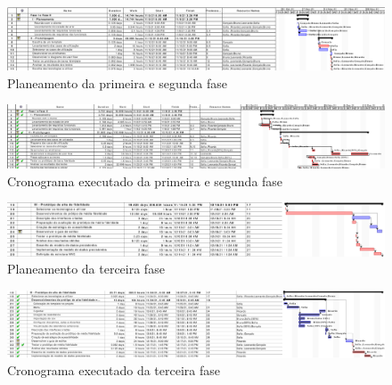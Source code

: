 \documentclass[11pt, twoside]{report}
\begin{document}
	\clearpage
	\begin{landscape}
		\pagestyle{empty}
		
		\begin{figure}[H] 
			\centering 			\includegraphics[width=1.4\textwidth,height=1.4\textheight,keepaspectratio]{image/planeamento_1fase}
			\caption{Planeamento da primeira e segunda fase}
			
		\end{figure}
	
	\begin{figure}[H] 
		\centering 			\includegraphics[width=1.4\textwidth,height=1.4\textheight,keepaspectratio]{image/cronogramaexecutado}
		\caption{Cronograma executado da primeira e segunda fase}
		\label{cronogramaexecutado}
	\end{figure}

	\begin{figure}[H] 
		\centering 			\includegraphics[width=1.4\textwidth,height=1.4\textheight,keepaspectratio]{image/Planeamentodaterceirafase}
		\caption{Planeamento da terceira fase}
		\label{planeamentoTerceiraFase}
	\end{figure}

	\begin{figure}[H] 
		\centering 			\includegraphics[width=1.4\textwidth,height=1.4\textheight,keepaspectratio]{image/cronogramaExecutado3}
		\caption{Cronograma executado da terceira fase}
		\label{cronogramaExcutado3}
		
	\end{figure}

	\end{landscape}
\end{document}
